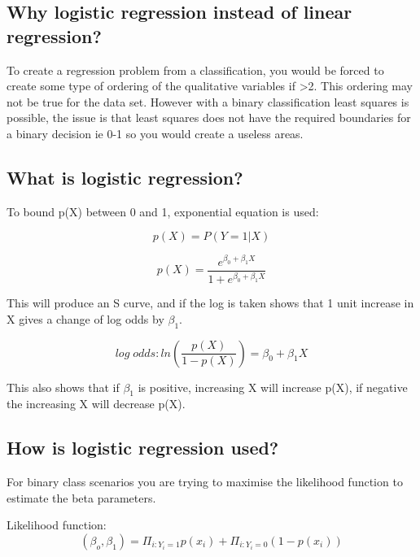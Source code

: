 \documentclass[11pt]{scrartcl} %
\begin{document}
\subsection{Why logistic regression instead of linear regression?}

To create a regression problem from a classification, you would be forced to create some type of ordering of the qualitative
variables if >2. This ordering may not be true for the data set. However with a binary classification least squares is possible, the
issue is that least squares does not have the required boundaries for a binary decision ie 0-1 so you would create a useless areas.

\subsection{What is logistic regression?}

To bound p(X) between 0 and 1, exponential equation is used:

\begin{equation}
	p(X) = P(Y=1|X)
\end{equation}

\begin{equation}
	p(X) = \frac{e^{\beta_0 + \beta_1X}}{1+e^{\beta_0 + \beta_1X}}
\end{equation}

This will produce an S curve, and if the log is taken shows that 1 unit increase in X gives a change of log odds by 
\( \beta_1\).

\begin{equation}
	log\; odds: ln(\frac{p(X)}{1-p(X)}) = \beta_0 + \beta_1X
\end{equation}

This also shows that if \(\beta_1\) is positive, increasing X will increase p(X), if negative the increasing X will
decrease p(X).

\subsection{How is logistic regression used?}

For binary class scenarios you are trying to maximise the likelihood function to estimate the beta parameters.

Likelihood function:
\begin{equation}
	(\beta_o,\beta_1) = \Pi_{i:Y_i=1}p(x_i) + \Pi_{i:Y_i=0}(1-p(x_i))
\end{equation}
\end{document}
